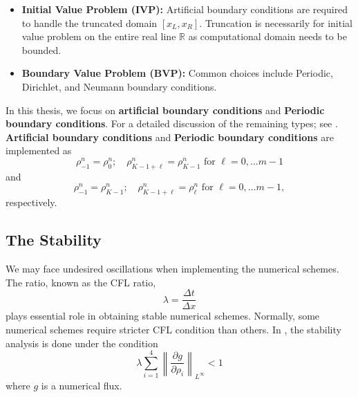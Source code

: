 \begin{itemize}
    \item \textbf{Initial Value Problem (IVP):} Artificial boundary conditions are required to handle the truncated domain $[x_L, x_R]$. Truncation is necessarily for initial value problem on the entire real line $\mathbb{R}$ as computational domain needs to be bounded.
    \item \textbf{Boundary Value Problem (BVP):} Common choices include  Periodic, Dirichlet, and Neumann boundary conditions.
\end{itemize}

In this thesis, we focus on \textbf{artificial boundary conditions} and \textbf{Periodic boundary conditions}. For a detailed discussion of the remaining types; see \cite[p.~58]{Ulrik2015}. \textbf{Artificial boundary conditions} and \textbf{Periodic boundary conditions} are implemented as
\[
    \rho_{-1}^{n}= \rho_{0}^n ;  \quad \rho_{K-1+\ell}^{n} = \rho_{K-1}^n \text{ for } \ell = 0, \dots m-1
\]
and
\[
    \rho_{-1}^{n}= \rho_{K-1}^n ; \quad \rho_{K-1+\ell}^{n} = \rho_{\ell}^n \text{ for } \ell = 0, \dots m-1,\]
respectively.

\subsection{The Stability}
We may face undesired oscillations when implementing the numerical schemes. The ratio, known as the CFL ratio,
\[
    \lambda = \frac{\Delta t}{\Delta x}
\]
plays essential role in obtaining stable numerical schemes. Normally, some numerical schemes require stricter CFL condition than others. In \cite{huangAsymptoticCompatibilityClass2024}, the stability analysis is done under the condition
\begin{equation}\label{eq:Lambda_condtitions}
    \lambda \sum_{i=1}^{4}
    \left\lVert \frac{\partial g}{\partial \rho_i} \right\rVert_{L^{\infty}} < 1
\end{equation}
where $g$ is a numerical flux.

